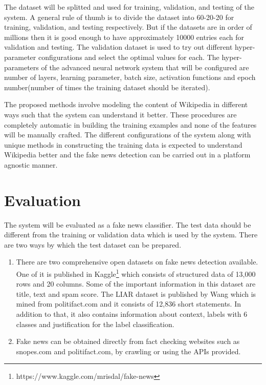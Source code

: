 \documentclass[a4paper, 11pt]{article}
\begin{document}
The dataset will be splitted and used for training, validation, and testing of the system. A general rule of thumb is to divide the dataset into 60-20-20 for training, validation, and testing respectively. But if the datasets are in order of millions then it is good enough to have approximately 10000 entries each for validation and testing. The validation dataset is used to try out different hyper-parameter configurations and select the optimal values for each. The hyper-parameters of the advanced neural network system that will be configured are number of layers, learning parameter, batch size, activation functions and epoch number(number of times the training dataset should be iterated).


The proposed methods involve modeling the content of Wikipedia in different ways such  that the system can understand it better. These procedures are completely automatic in building the training examples and none of the features will be manually crafted. The different configurations of the system along with unique methods in constructing the training data is expected to understand Wikipedia better and the fake news detection can be carried out in a platform agnostic manner. 

\section{Evaluation}

The system will be evaluated as a fake news classifier. The test data should be different from the training or validation data which is used by the system. There are two ways by which the test dataset can be prepared.
\begin{enumerate}
\item There are two comprehensive open datasets on fake news detection available. One of it is published in Kaggle\footnote{https://www.kaggle.com/mrisdal/fake-news} which consists of structured data of 13,000 rows and 20 columns. Some of the important information in this dataset are title, text and spam score. The LIAR dataset is published by Wang \cite{Wang2017} which is mined from politifact.com and it consists of 12,836 short statements. In addition to that, it also contains information about context, labels with 6 classes and justification for the label classification. 
\item Fake news can be obtained directly from fact checking websites such as snopes.com and politifact.com, by crawling or using the APIs provided.
\end{enumerate}
\end{document}
